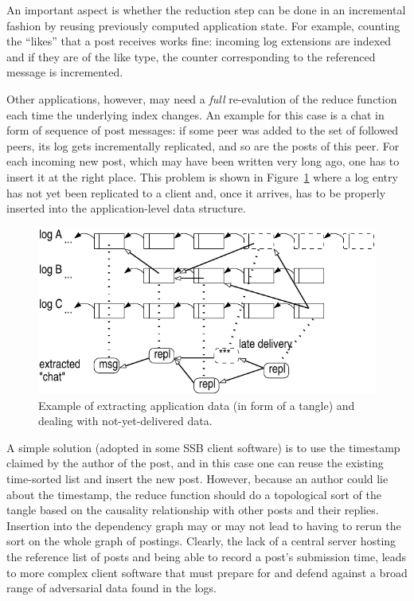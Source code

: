 \documentclass[9pt,sigconf,rewiew]{acmart}
\begin{document}
An important aspect is whether the reduction step can be done in an
incremental fashion by reusing previously computed application state.
For example, counting the ``likes'' that a post receives works fine:
incoming log extensions are indexed and if they are of the like type,
the counter corresponding to the referenced message is incremented.

Other applications, however, may need a {\em full} re-evalution of the
reduce function each time the underlying index changes. An example for
this case is a chat in form of sequence of post messages: if some peer was added to
the set of followed peers, its log gets incrementally replicated, and
so are the posts of this peer. For each incoming new post, which may
have been written very long ago, one has to insert it at the right
place. This problem is shown in Figure~\ref{fig:tangle} where a log
entry has not yet been replicated to a client and, once it arrives,
has to be properly inserted into the application-level data structure.

\begin{figure}[htb]
  \includegraphics[width=0.9\columnwidth]{figs/tangle.pdf}
  \caption{Example of extracting application data (in form of
    a tangle) and dealing
    with not-yet-delivered data.\label{fig:tangle}}
\end{figure}

A simple solution (adopted in some SSB client software) is to use the
timestamp claimed by the author of the post, and in this case one can
reuse the existing time-sorted list and insert the new post. However,
because an author could lie about the timestamp, the reduce function
should do a topological sort of the tangle based on the causality relationship with
other posts and their replies. Insertion into the dependency graph may
or may not lead to having to rerun the sort on the whole graph of
postings. Clearly, the lack of a central server hosting the reference
list of posts and being able to record a post's submission time, leads
to more complex client software that must prepare for and defend
against a broad range of adversarial data found in the logs.
\end{document}
